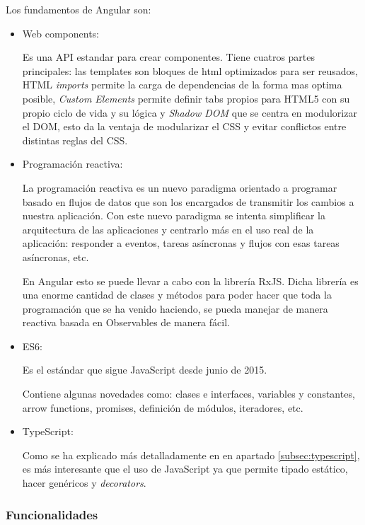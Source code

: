 \documentclass[a4paper, 12pt]{book}
\begin{document}
Los fundamentos de Angular son: 

\begin{itemize}
  \item Web components: 

	Es una API estandar para crear componentes. Tiene cuatros partes principales: las templates son bloques de html optimizados para ser reusados, HTML \emph{imports} permite la carga de dependencias de la forma mas optima posible, \emph{Custom Elements} permite definir tabs propios para HTML5 con su propio ciclo de vida y su l\'ogica y \emph{Shadow DOM} que se centra en modulorizar el DOM, esto da la ventaja de modularizar el CSS y evitar conflictos entre distintas reglas del CSS.

\item Programaci\'on reactiva:

La programaci\'on reactiva es un nuevo paradigma orientado a programar basado en flujos de datos que son los encargados de transmitir los cambios a nuestra aplicaci\'on. Con este nuevo paradigma se intenta simplificar la arquitectura de las aplicaciones y centrarlo m\'as en el uso real de la aplicaci\'on: responder a eventos, tareas as\'incronas y flujos con esas tareas as\'incronas, etc.

En Angular esto se puede llevar a cabo con la librer\'ia RxJS. Dicha librer\'ia es una enorme cantidad de clases y m\'etodos para poder hacer que toda la programaci\'on que se ha venido haciendo, se pueda manejar de manera reactiva basada en Observables de manera f\'acil.

\item ES6:

Es el est\'andar que sigue JavaScript desde junio de 2015. 

Contiene algunas novedades como: clases e interfaces, variables y constantes, arrow functions, promises, definici\'on de m\'odulos, iteradores, etc.

\item TypeScript:

Como se ha explicado m\'as detalladamente en en apartado \ref{subsec:typescript}, es m\'as interesante que el uso de JavaScript ya que permite tipado est\'atico, hacer gen\'ericos y \emph{decorators}.

\end{itemize}

\subsubsection{Funcionalidades}
\label{subsec:func_angular}
\end{document}
